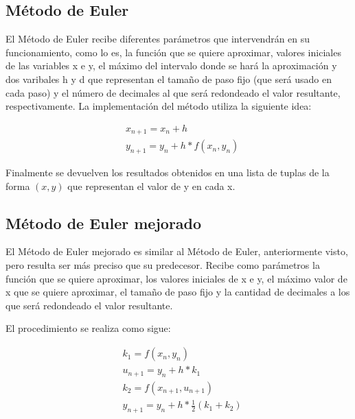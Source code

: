 \documentclass[a4paper.10pt]{article}
\begin{document}
\subsection{M\'etodo de Euler}
El M\'etodo de Euler recibe diferentes par\'ametros que intervendr\'an en su funcionamiento, como lo es, la funci\'on que se quiere aproximar, valores iniciales de las variables x e y, el m\'aximo del intervalo donde se har\'a la aproximaci\'on y dos varibales h y d que representan el tama\~no de paso fijo (que ser\'a usado en cada paso) y el n\'umero de decimales al que ser\'a redondeado el valor resultante, respectivamente.
La implementaci\'on del m\'etodo utiliza la siguiente idea:

\begin{equation*}
    \begin{aligned}
         & x_{n+1}=x_n + h            \\
         & y_{n+1}=y_n + h*f(x_n,y_n)
    \end{aligned}
\end{equation*}

Finalmente se devuelven los resultados obtenidos en una lista de tuplas de la forma $(x,y)$ que representan el valor de y en cada x.

\subsection{M\'etodo de Euler mejorado}

El M\'etodo de Euler mejorado es similar al M\'etodo de Euler, anteriormente visto, pero resulta ser m\'as preciso que su predecesor.
Recibe como par\'ametros la funci\'on que se quiere aproximar, los valores iniciales de x e y, el m\'aximo valor de x que se quiere aproximar, el tama\~no de paso fijo y la cantidad de decimales a los que ser\'a redondeado el valor resultante.

El procedimiento se realiza como sigue:

\begin{equation*}
    \begin{aligned}
         & k_1=f(x_n,y_n)                     \\
         & u_{n+1}= y_n + h*k_1               \\
         & k_2=f(x_{n+1},u_{n+1})             \\
         & y_{n+1}=y_n+h*\frac{1}{2}(k_1+k_2)
    \end{aligned}
\end{equation*}
\end{document}
